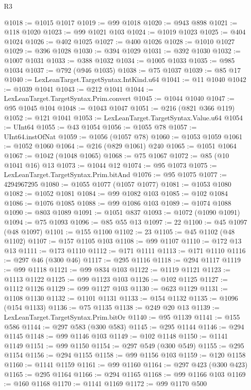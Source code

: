 \begin{lexlean}{R3}
\begin{coremodule}
@1018 := @1015 @1017
@1019 := @99 @1018
@1020 := @943 @898
@1021 := @118 @1020
@1023 := @99 @1021 @103
@1024 := @1019 @1023
@1025 := @404 @1024
@1026 := @402 @1025
@1027 := @400 @1026
@1028 := @1010 @1027
@1029 := @396 @1028
@1030 := @394 @1029
@1031 := @392 @1030
@1032 := @1007 @1031
@1033 := @388 @1032
@1034 := @1005 @1033
@1035 := @985 @1034
@1037 := @792 (@946 @1035)
@1038 := @75 @1037
@1039 := @85 @17
@1040 := LexLeanTarget.TargetSyntax.IntKind.u64
@1041 := @11 @1040
@1042 := @1039 @1041
@1043 := @212 @1041
@1044 := LexLeanTarget.TargetSyntax.Prim.convert
@1045 := @1044 @1040
@1047 := @95 @1045 @104
@1048 := @1043 @1047
@1051 := @216 (@821 @366 @119)
@1052 := @121 @1041
@1053 := LexLeanTarget.TargetSyntax.Value.u64
@1054 := UInt64
@1055 := @43 @1054
@1056 := @1055 @78
@1057 := UInt64.instOfNat
@1059 := @1056 (@1057 @78)
@1060 := @1053 @1059
@1061 := @1052 @1060
@1064 := @216 (@829 @1061) @240
@1065 := @1051 @1064
@1067 := @1042 (@1048 @1065)
@1068 := @75 @1067
@1072 := @85 (@10 @1041 @16) @13
@1073 := @1044 @12
@1074 := @95 @1073
@1075 := LexLeanTarget.TargetSyntax.Prim.bitAnd
@1076 := @95 @1075
@1077 := 4294967295
@1080 := @1055 @1077 (@1057 @1077)
@1081 := @1053 @1080
@1082 := @1052 @1081
@1084 := @99 @1082 @103
@1085 := @102 @1084
@1086 := @1076 @1085
@1088 := @99 @1086 @103
@1089 := @1074 @1088
@1090 := @803 @1089
@1091 := @1051 @837
@1093 := @1072 (@1090 @1091)
@1094 := @75 @1093
@1096 := @85 @55 @13
@1097 := 22
@1100 := @45 @1097 (@48 @1097)
@1101 := @155 @1100
@1102 := 23
@1105 := @45 @1102 (@48 @1102)
@1107 := @157 @1105 @103
@1108 := @99 @1107
@1110 := @172 @13 @13
@1111 := @173 @1110
@1112 := @171 @1111
@1113 := @171 @1110
@1116 := @297 @46 (@300 @46)
@1117 := @295 @1116
@1118 := @294 @1117
@1119 := @99 @1118
@1121 := @99 @834 @103
@1122 := @1119 @1121
@1123 := @1113 @1122
@1125 := @99 @1123 @103
@1126 := @102 @1125
@1127 := @1112 @1126
@1129 := @99 @1127 @103
@1130 := @623 @1129
@1131 := @1108 @1130
@1132 := @1101 @1131
@1133 := @154 @1132
@1135 := @1096 (@154 @1133)
@1136 := @75 @1135
@1138 := @249 @20 @13
@1139 := LexLeanTarget.TargetSyntax.Prim.bitOr
@1140 := @95 @1139
@1141 := @155 @586
@1144 := @297 @583 (@300 @583)
@1145 := @295 @1144
@1146 := @294 @1145
@1148 := @99 @1146 @103
@1149 := @102 @1148
@1150 := @1141 @1149
@1151 := @99 @1150
@1154 := @297 @549 (@300 @549)
@1155 := @295 @1154
@1156 := @294 @1155
@1158 := @99 @1156 @103
@1159 := @120 @1158
@1160 := @1141 @1159
@1161 := @99 @1160
@1164 := @297 @423 (@300 @423)
@1165 := @295 @1164
@1166 := @294 @1165
@1168 := @99 @1166 @103
@1169 := @160 @1168
@1170 := @1141 @1169
@1172 := @99 @1170 @500

\end{coremodule}
\end{lexlean}
